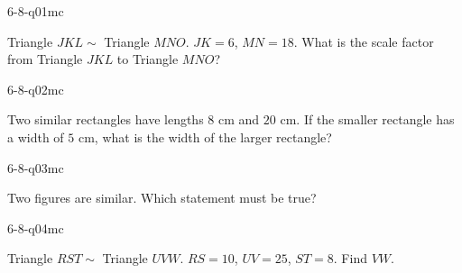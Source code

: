 

\begin{practiceQuestion}{6-8-q01}{mc}
\begin{questionText}
Triangle $JKL \sim$ Triangle $MNO$. $JK = 6$, $MN = 18$. What is the scale factor from Triangle $JKL$ to Triangle $MNO$?
\end{questionText}
\end{practiceQuestion}

\begin{practiceQuestion}{6-8-q02}{mc}
\begin{questionText}
Two similar rectangles have lengths $8$ cm and $20$ cm. If the smaller rectangle has a width of $5$ cm, what is the width of the larger rectangle?
\end{questionText}
\end{practiceQuestion}

\begin{practiceQuestion}{6-8-q03}{mc}
\begin{questionText}
Two figures are similar. Which statement must be true?
\end{questionText}
\end{practiceQuestion}

\begin{practiceQuestion}{6-8-q04}{mc}
\begin{questionText}
Triangle $RST \sim$ Triangle $UVW$. $RS = 10$, $UV = 25$, $ST = 8$. Find $VW$.
\end{questionText}
\end{practiceQuestion}

